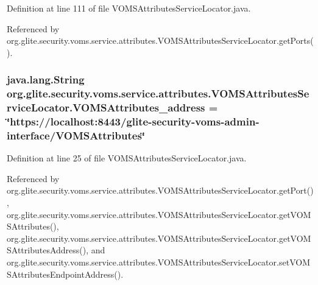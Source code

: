 Definition at line 111 of file VOMSAttributesServiceLocator.java.



Referenced by org.glite.security.voms.service.attributes.VOMSAttributesServiceLocator.getPorts().

\hypertarget{classorg_1_1glite_1_1security_1_1voms_1_1service_1_1attributes_1_1VOMSAttributesServiceLocator_ad60712619f4629f1ba9ce1eef12e53e3}{
\subsubsection[{VOMSAttributes\_\-address}]{\setlength{\rightskip}{0pt plus 5cm}java.lang.String {\bf org.glite.security.voms.service.attributes.VOMSAttributesServiceLocator.VOMSAttributes\_\-address} = \char`\"{}https://localhost:8443/glite-\/security-\/voms-\/admin-\/interface/{\bf VOMSAttributes}\char`\"{}}}
\label{classorg_1_1glite_1_1security_1_1voms_1_1service_1_1attributes_1_1VOMSAttributesServiceLocator_ad60712619f4629f1ba9ce1eef12e53e3}


Definition at line 25 of file VOMSAttributesServiceLocator.java.



Referenced by org.glite.security.voms.service.attributes.VOMSAttributesServiceLocator.getPort(), org.glite.security.voms.service.attributes.VOMSAttributesServiceLocator.getVOMSAttributes(), org.glite.security.voms.service.attributes.VOMSAttributesServiceLocator.getVOMSAttributesAddress(), and org.glite.security.voms.service.attributes.VOMSAttributesServiceLocator.setVOMSAttributesEndpointAddress().

